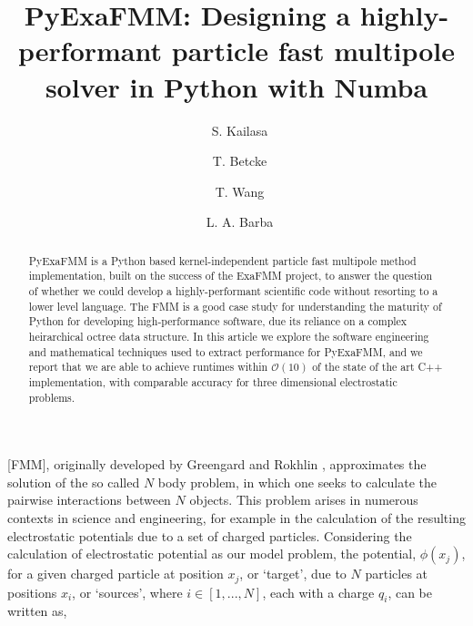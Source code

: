 \documentclass{IEEEcsmag}
\begin{document}

\title{PyExaFMM: Designing a highly-performant particle fast multipole solver in Python with Numba}

\author{\ S. Kailasa}

\author{\ T. Betcke}

\author{\ T. Wang}

\author{\ L. A. Barba}


\begin{abstract}
PyExaFMM is a Python based kernel-independent particle fast multipole method implementation, built on the success of the ExaFMM project, to answer the question of whether we could develop a highly-performant scientific code without resorting to a lower level language. The FMM is a good case study for understanding the maturity of Python for developing high-performance software, due its reliance on a complex heirarchical octree data structure. In this article we explore the software engineering and mathematical techniques used to extract performance for PyExaFMM, and we report that we are able to achieve runtimes within $\mathcal{O}(10)$ of the state of the art C++ implementation, with comparable accuracy for three dimensional electrostatic problems.

\end{abstract}

\maketitle

 [FMM], originally developed by Greengard and Rokhlin \cite{Greengard1987}, approximates the solution of the so called $N$ body problem, in which one seeks to calculate the pairwise interactions between $N$ objects. This problem arises in numerous contexts in science and engineering, for example in the calculation of the resulting electrostatic potentials due to a set of charged particles. Considering the calculation of electrostatic potential as our model problem, the potential, $\phi(x_j)$, for a given charged particle at position $x_j$, or `target', due to $N$ particles at positions $x_i$, or `sources', where $i \in [1, ..., N]$, each with a charge $q_i$, can be written as,
\end{document}
